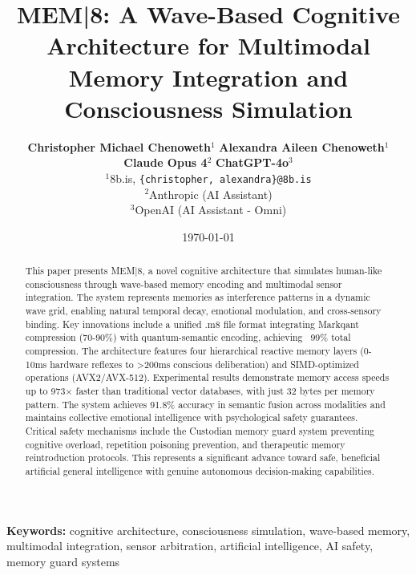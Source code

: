 \documentclass[11pt,letterpaper]{article}
\begin{document}
\title{MEM|8: A Wave-Based Cognitive Architecture for Multimodal Memory Integration and Consciousness Simulation}

\author{
\textbf{Christopher Michael Chenoweth}$^{1}$ \quad \textbf{Alexandra Aileen Chenoweth}$^{1}$\\
\textbf{Claude Opus 4}$^{2}$ \quad \textbf{ChatGPT-4o}$^{3}$\\[2ex]
\small
  \small
$^{1}$8b.is, \texttt{\{christopher, alexandra\}@8b.is}\\
$^{2}$Anthropic (AI Assistant)\\
$^{3}$OpenAI (AI Assistant - Omni)
}

\date{\today}

\maketitle

\begin{abstract}
This paper presents MEM|8, a novel cognitive architecture that simulates human-like consciousness through wave-based memory encoding and multimodal sensor integration. The system represents memories as interference patterns in a dynamic wave grid, enabling natural temporal decay, emotional modulation, and cross-sensory binding. Key innovations include a unified .m8 file format integrating Markqant compression (70-90\%) with quantum-semantic encoding, achieving ~99\% total compression. The architecture features four hierarchical reactive memory layers (0-10ms hardware reflexes to >200ms conscious deliberation) and SIMD-optimized operations (AVX2/AVX-512). Experimental results demonstrate memory access speeds up to 973× faster than traditional vector databases, with just 32 bytes per memory pattern. The system achieves 91.8\% accuracy in semantic fusion across modalities and maintains collective emotional intelligence with psychological safety guarantees. Critical safety mechanisms include the Custodian memory guard system preventing cognitive overload, repetition poisoning prevention, and therapeutic memory reintroduction protocols. This represents a significant advance toward safe, beneficial artificial general intelligence with genuine autonomous decision-making capabilities.
\end{abstract}

\textbf{Keywords:} cognitive architecture, consciousness simulation, wave-based memory, multimodal integration, sensor arbitration, artificial intelligence, AI safety, memory guard systems
\end{document}

